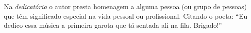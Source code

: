 Na \emph{dedicatória} o autor presta homenagem a alguma pessoa (ou grupo de pessoas)
que têm significado especial na vida pessoal ou profissional. Citando o poeta: 
``Eu dedico essa música a primeira garota que tá sentada ali na fila. Brigado!''